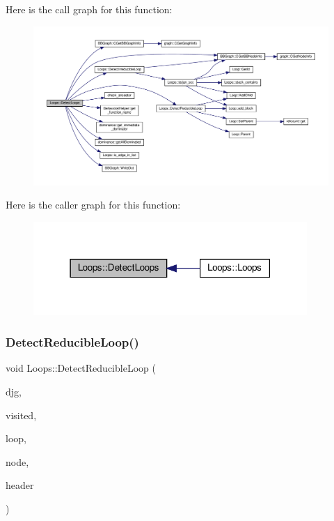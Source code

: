 Here is the call graph for this function\+:
\nopagebreak
\begin{figure}[H]
\begin{center}
\leavevmode
\includegraphics[width=350pt]{d3/ded/classLoops_ab4e1b49b594312ae244e75093833b672_cgraph}
\end{center}
\end{figure}
Here is the caller graph for this function\+:
\nopagebreak
\begin{figure}[H]
\begin{center}
\leavevmode
\includegraphics[width=295pt]{d3/ded/classLoops_ab4e1b49b594312ae244e75093833b672_icgraph}
\end{center}
\end{figure}
\mbox{\label{classLoops_a2da630bd46322a13de6b01c173dd708e}} 
\subsubsection{\texorpdfstring{Detect\+Reducible\+Loop()}{DetectReducibleLoop()}}
{\footnotesize\ttfamily void Loops\+::\+Detect\+Reducible\+Loop (\begin{DoxyParamCaption}\item[{const \hyperlink{basic__block_8hpp_a0e7f233d1b83cad0bfd5aa865f0d3532}{B\+B\+Graph\+Ref}}]{djg,  }\item[{\hyperlink{classCustomOrderedSet}{Custom\+Ordered\+Set}$<$ \hyperlink{graph_8hpp_abefdcf0544e601805af44eca032cca14}{vertex} $>$ \&}]{visited,  }\item[{\hyperlink{loop_8hpp_aa4a60313089619376f67557c4120423c}{Loop\+Ref}}]{loop,  }\item[{\hyperlink{graph_8hpp_abefdcf0544e601805af44eca032cca14}{vertex}}]{node,  }\item[{\hyperlink{graph_8hpp_abefdcf0544e601805af44eca032cca14}{vertex}}]{header }\end{DoxyParamCaption})\hspace{0.3cm}{\ttfamily [private]}}



